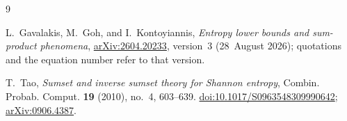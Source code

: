 \documentclass[11pt]{amsart}
\theoremstyle{remark}
\begin{document}
\begin{thebibliography}{9}

L.~Gavalakis, M.~Goh, and I.~Kontoyiannis,
\emph{Entropy lower bounds and sum-product phenomena},
\href{https://arxiv.org/abs/2604.20233}{arXiv:2604.20233}, version~3
(28~August 2026); quotations and the equation number refer to that version.

T.~Tao,
\emph{Sumset and inverse sumset theory for Shannon entropy},
Combin. Probab. Comput. \textbf{19} (2010), no.~4, 603--639.
\href{https://doi.org/10.1017/S0963548309990642}{doi:10.1017/S0963548309990642};
\href{https://arxiv.org/abs/0906.4387}{arXiv:0906.4387}.

\end{thebibliography}
\end{document}
